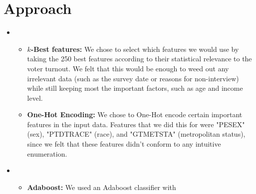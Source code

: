 \section{Approach}
\medskip
\begin{itemize}

    \item {}
    \begin{itemize}
    \item \textbf{$k$-Best features:}
    We chose to select which features we would use by taking the 250 best features according to their statistical relevance to the voter turnout. We felt that this would be enough to weed out any irrelevant data (such as the survey date or reasons for non-interview) while still keeping most the important factors, such as age and income level.

    \item \textbf{One-Hot Encoding:}
    We chose to One-Hot encode certain important features in the input data. Features that we did this for were "PESEX" (sex), "PTDTRACE" (race), and "GTMETSTA" (metropolitan status), since we felt that these features didn't conform to any intuitive enumeration.

    \end{itemize}

    \item {}
    \begin{itemize}
    \item \textbf{Adaboost:} We used an Adaboost classifier with


    \end{itemize}

\end{itemize}



